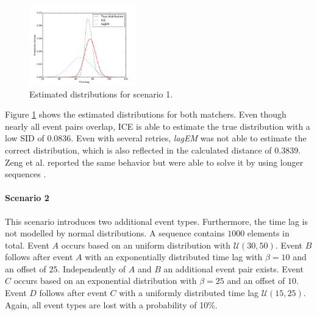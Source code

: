\documentclass[conference]{IEEEtran}
\theoremstyle{examplestyle}
\newcommand\imgsize{0.415}
\begin{document}
\begin{figure}[!tb]
	\centering
	\includegraphics[width=\imgsize\textwidth]{images/scenarios/1.pdf}
	\caption{Estimated distributions for scenario 1.}
	\label{fig:scen1}
\end{figure}

Figure \ref{fig:scen1} shows the estimated distributions for both matchers. Even though nearly all event pairs overlap, \ac{ICE} is able to estimate the true distribution with a low \ac{SID} of $0.0836$. Even with several retries, \textit{lagEM} was not able to estimate the correct distribution, which is also reflected in the calculated distance of $0.3839$. Zeng et al. reported the same behavior but were able to solve it by using longer sequences \cite{Zeng2015}.




\paragraph{Scenario 2}
This scenario introduces two additional event types. Furthermore, the time lag is not modelled by normal distributions. A sequence contains $1000$ elements in total. Event \(A\) occurs based on an uniform distribution with \(\mathcal{U}(30, 50)\). Event \(B\) follows after event \(A\) with an exponentially distributed time lag with \(\beta = 10\) and an offset of $25$. Independently of \(A\) and \(B\) an additional event pair exists. Event \(C\) occurs based on an exponential distribution with \(\beta = 25\) and an offset of $10$. Event \(D\) follows after event \(C\) with a uniformly distributed time lag \(\mathcal{U}(15, 25)\). Again, all event types are lost with a probability of 10\%.
\end{document}
